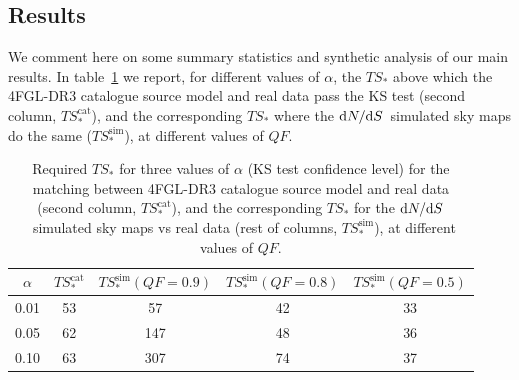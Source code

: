 \subsection{Results}
\label{sec:catalogue}

We comment here on some summary statistics and synthetic analysis of our main results.
%
In table~\ref{tab:tsstar} we report, for different values of $\alpha$, the 
$TS_*$ above which the 4FGL-DR3 catalogue source model and real data pass the KS test (second column, $TS_*^\textrm{cat}$), and the corresponding $TS_*$ where the $\textrm{d}N/\textrm{d}S$~simulated sky maps do the same ($TS_*^\textrm{sim}$), at different values of $QF$.
\begin{table}[!h]
    \renewcommand{\arraystretch}{1.2}
    \centering
    \begin{tabular}{c|c|c|c|c}   
        $\alpha$ & $TS_*^\textrm{cat}$ & $TS_*^\textrm{sim}(QF=0.9)$& $TS_*^\textrm{sim}(QF=0.8)$&  $TS_*^\textrm{sim}(QF=0.5)$\\
        \hline 
       0.01 & 53 & 57 & 42 & 33\\ 
        \hline 
       0.05 & 62 & 147 & 48 & 36\\ 
        \hline 
       0.10 & 63 & 307 & 74 & 37\\
    \end{tabular}
\caption{Required $TS_*$ for three values of $\alpha$ (KS test confidence level) for the matching between 4FGL-DR3 catalogue source model and real data (second column, $TS_*^\textrm{cat}$), and the corresponding $TS_*$ for the $\textrm{d}N/\textrm{d}S$~simulated sky maps vs real data (rest of columns, $TS_*^\textrm{sim}$), at different values of $QF$.}  
\label{tab:tsstar}
\end{table}

